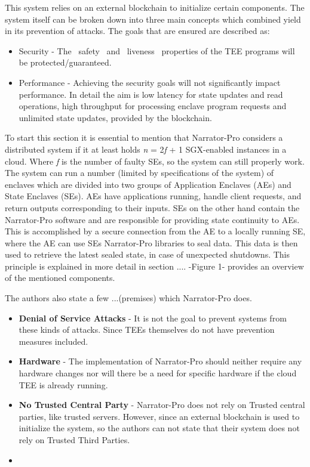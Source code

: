  

This system relies on an external blockchain to initialize certain components. The system itself can be broken down into three main concepts which combined yield in its prevention of attacks. The goals that are ensured are described as:
\begin{itemize}
     \item Security - The ~safety~ and ~liveness~ properties of the TEE programs will be protected/guaranteed.
     \item Performance - Achieving the security goals will not significantly impact performance. In detail the aim is low latency for state updates and read operations, high throughput for processing enclave program requests and unlimited state updates, provided by the blockchain.
\end{itemize} 
To start this section it is essential to mention that Narrator-Pro considers a distributed system if it at least holds \textit{n} = 2\textit{f} + 1 SGX-enabled instances in a cloud. Where \textit{f} is the number of faulty SEs, so the system can still properly work. The system can run a number (limited by specifications of the system) of enclaves which are divided into two groups of Application Enclaves (AEs) and State Enclaves (SEs). AEs have applications running, handle client requests, and return outputs corresponding to their inputs. SEs on the other hand contain the Narrator-Pro software and are responsible for providing state continuity to AEs. This is accomplished by a secure connection from the AE to a locally running SE, where the AE can use SEs Narrator-Pro libraries to seal data. This data is then used to retrieve the latest sealed state, in case of unexpected shutdowns. This principle is explained in more detail in section .... -Figure 1- provides an overview of the mentioned components.

The authors also state a few ...(premises) which Narrator-Pro does. 
\begin{itemize}
    \item \textbf{Denial of Service Attacks} - It is not the goal to prevent systems from these kinds of attacks. Since TEEs themselves do not have prevention measures included.  
    \item \textbf{Hardware} - The implementation of Narrator-Pro should neither require any hardware changes nor will there be a need for specific hardware if the cloud TEE is already running.  
    \item \textbf{No Trusted Central Party} - Narrator-Pro does not rely on Trusted central parties, like trusted servers. However, since an external blockchain is used to initialize the system, so the authors can not state that their system does not rely on Trusted Third Parties.
    \item \textbf{}
\end{itemize} 

